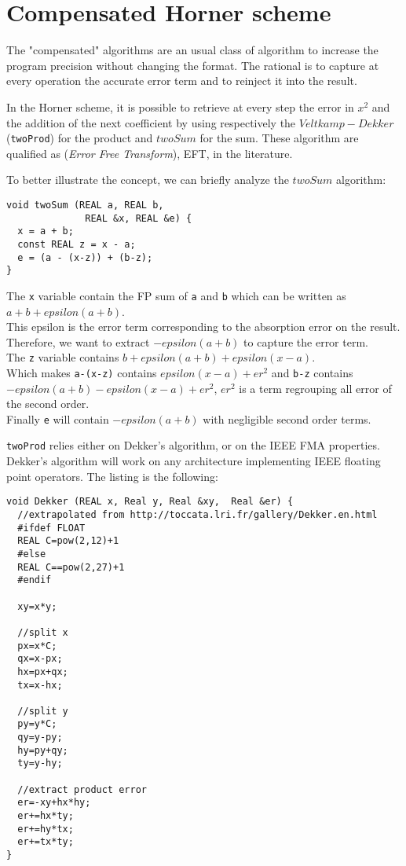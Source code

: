 \section{Compensated Horner scheme}

The "compensated" algorithms are an usual class of algorithm to increase the program precision without changing the format. The rational is to capture at every operation the accurate error term and to reinject it into the result.

In the Horner scheme, it is possible to retrieve at every step the error in $x^2$ and the addition of the next coefficient by using respectively the
$Veltkamp-Dekker$ ({\tt twoProd}) for the product and
$twoSum$ for the sum. These algorithm are qualified as
({\it Error Free Transform}), EFT, in the literature.


To better illustrate the concept, we can briefly analyze the $twoSum$ algorithm:
\begin{lstlisting}[frame=single, style=customC]
void twoSum (REAL a, REAL b,
              REAL &x, REAL &e) {
  x = a + b;
  const REAL z = x - a;
  e = (a - (x-z)) + (b-z);
}
\end{lstlisting}

The {\tt x} variable contain the FP sum of  {\tt a}  and  {\tt b} which can be written as $a+b+epsilon(a+b)$. \\
This epsilon is the error term corresponding to the absorption error on the result. \\
Therefore, we want to extract $ -epsilon(a+b)$ to capture the error term.  \\
The {\tt z} variable contains $b + epsilon(a+b)+epsilon(x-a)$. \\
Which makes {\tt a-(x-z)} contains $epsilon(x-a)+er^2$ and {\tt b-z} contains $-epsilon(a+b)-epsilon(x-a)+er^2$, $er^2$ is a term regrouping all error of the second order. \\
Finally {\tt e} will contain $-epsilon(a+b)$ with negligible second order terms.


{\tt twoProd} relies either on Dekker's algorithm, or on the IEEE FMA properties.
Dekker's algorithm will work on any architecture implementing IEEE floating point operators.
The listing is the following:
\begin{lstlisting}[frame=single, style=customC]
void Dekker (REAL x, Real y, Real &xy,  Real &er) {
  //extrapolated from http://toccata.lri.fr/gallery/Dekker.en.html
  #ifdef FLOAT
  REAL C=pow(2,12)+1
  #else
  REAL C==pow(2,27)+1
  #endif

  xy=x*y;

  //split x
  px=x*C;
  qx=x-px;
  hx=px+qx;
  tx=x-hx;

  //split y
  py=y*C;
  qy=y-py;
  hy=py+qy;
  ty=y-hy;

  //extract product error
  er=-xy+hx*hy;
  er+=hx*ty;
  er+=hy*tx;
  er+=tx*ty;
}
\end{lstlisting}

